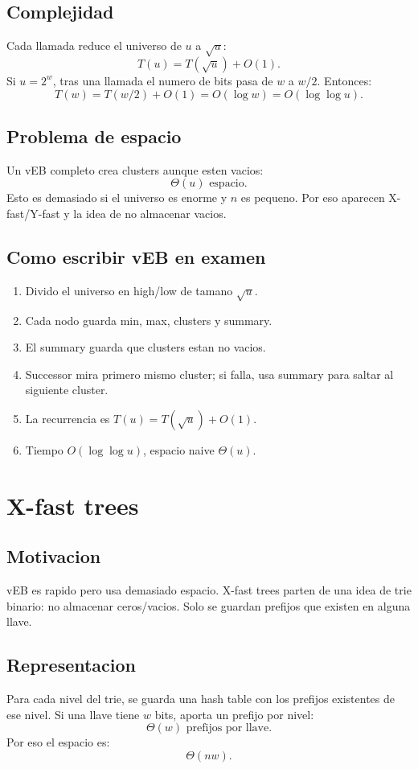 \documentclass[10pt]{article}
\newcommand{\bigO}{O}
\begin{document}
\subsection{Complejidad}
Cada llamada reduce el universo de $u$ a $\sqrt u$:
\[
T(u)=T(\sqrt u)+\bigO(1).
\]
Si $u=2^w$, tras una llamada el numero de bits pasa de $w$ a $w/2$. Entonces:
\[
T(w)=T(w/2)+\bigO(1)=\bigO(\log w)=\bigO(\log\log u).
\]

\subsection{Problema de espacio}
Un vEB completo crea clusters aunque esten vacios:
\[
\Theta(u)\text{ espacio}.
\]
Esto es demasiado si el universo es enorme y $n$ es pequeno. Por eso aparecen
X-fast/Y-fast y la idea de no almacenar vacios.

\subsection{Como escribir vEB en examen}
\begin{enumerate}[leftmargin=*]
\item Divido el universo en high/low de tamano $\sqrt u$.
\item Cada nodo guarda min, max, clusters y summary.
\item El summary guarda que clusters estan no vacios.
\item Successor mira primero mismo cluster; si falla, usa summary para saltar al
siguiente cluster.
\item La recurrencia es $T(u)=T(\sqrt u)+\bigO(1)$.
\item Tiempo $\bigO(\log\log u)$, espacio naive $\Theta(u)$.
\end{enumerate}

\newpage
\section{X-fast trees}

\subsection{Motivacion}
vEB es rapido pero usa demasiado espacio. X-fast trees parten de una idea de
trie binario: no almacenar ceros/vacios. Solo se guardan prefijos que existen en
alguna llave.

\subsection{Representacion}
Para cada nivel del trie, se guarda una hash table con los prefijos existentes
de ese nivel. Si una llave tiene $w$ bits, aporta un prefijo por nivel:
\[
\Theta(w)\text{ prefijos por llave}.
\]
Por eso el espacio es:
\[
\Theta(nw).
\]
\end{document}
